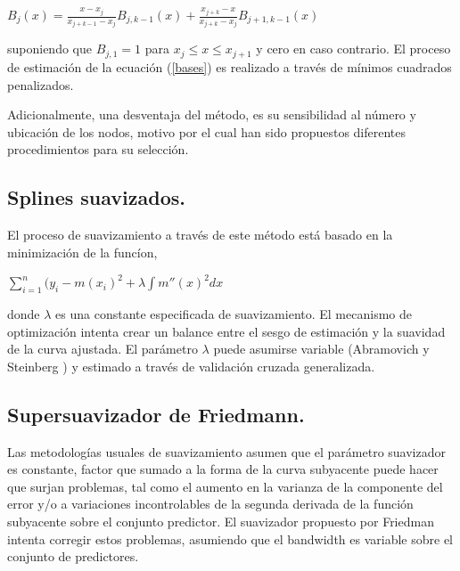 \vspace*{0.2 cm}


\begin{center}
$\displaystyle{ B_{j}(x) = \frac{x-x_{j}}{x_{j+k-1}-x_{j}} B_{j,k-1}(x) + \frac{x_{j+k}-x}{x_{j+k}-x_{j}} B_{j+1,k-1}(x) }$
\end{center}

\vspace*{0.2 cm}


\noindent suponiendo que $B_{j,1}=1$ para $x_{j} \leq x \leq x_{j+1}$ y cero en caso contrario. El proceso de estimaci\'on de la ecuaci\'on (\ref{bases}) es realizado a trav\'es de m\'inimos cuadrados penalizados.

\hspace*{0.4 cm}Adicionalmente, una desventaja del m\'etodo, es su sensibilidad al n\'umero y ubicaci\'on de los nodos, motivo por el cual han sido propuestos diferentes procedimientos para su selecci\'on.

\subsection{Splines suavizados.\\}



\hspace*{0.4 cm}El proceso de suavizamiento a trav\'es de este m\'etodo est\'a basado en la minimizaci\'on de la func\'ion,

\begin{center}
$\displaystyle{ \sum_{i=1}^{n} (y_{i}-m(x_{i})^2 + \lambda \int m''(x)^2dx  }$
\end{center}

\vspace*{0.2 cm}

\noindent donde $\lambda$ es una constante especificada de suavizamiento. El mecanismo de optimizaci\'on intenta crear un balance entre el sesgo de estimaci\'on y la suavidad de la curva ajustada. El par\'ametro $\lambda$ puede asumirse variable (Abramovich y Steinberg \cite{AS}) y estimado a trav\'es de validaci\'on cruzada generalizada.

\subsection{Supersuavizador de Friedmann.\\}


\hspace*{0.4 cm} Las metodolog\'ias usuales de suavizamiento asumen que el par\'ametro suavizador es constante, factor que sumado a la forma de la curva subyacente puede hacer que surjan problemas, tal como el aumento en la varianza de la componente del error y/o a variaciones incontrolables de la segunda derivada de la funci\'on subyacente sobre el conjunto predictor. El suavizador propuesto por Friedman \cite{F} intenta corregir estos problemas, asumiendo que el bandwidth es variable sobre el conjunto de predictores.


